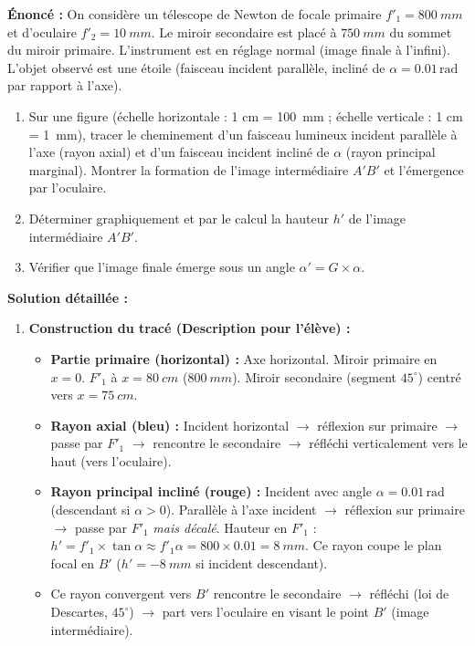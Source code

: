 \documentclass[11pt]{article}
\begin{document}
\begin{exoresolu}
\textbf{Énoncé :} On considère un télescope de Newton de focale primaire $f'_1 = \SI{800}{mm}$ et d'oculaire $f'_2 = \SI{10}{mm}$. Le miroir secondaire est placé à $\SI{750}{mm}$ du sommet du miroir primaire. L'instrument est en réglage normal (image finale à l'infini). L'objet observé est une étoile (faisceau incident parallèle, incliné de $\alpha = \num{0,01}\,\text{rad}$ par rapport à l'axe).
\begin{enumerate}
    \item Sur une figure (échelle horizontale : 1 cm = \SI{100}{mm} ; échelle verticale : 1 cm = \SI{1}{mm}), tracer le cheminement d'un faisceau lumineux incident parallèle à l'axe (rayon axial) et d'un faisceau incident incliné de $\alpha$ (rayon principal marginal). Montrer la formation de l'image intermédiaire $A'B'$ et l'émergence par l'oculaire.
    \item Déterminer graphiquement et par le calcul la hauteur $h'$ de l'image intermédiaire $A'B'$.
    \item Vérifier que l'image finale émerge sous un angle $\alpha' = G \times \alpha$.
\end{enumerate}
\tcblower
\textbf{Solution détaillée :}
\begin{enumerate}
    \item \textbf{Construction du tracé (Description pour l'élève) :}
    \begin{itemize}
        \item \textbf{Partie primaire (horizontal) :} Axe horizontal. Miroir primaire en $x=0$. $F'_1$ à $x=\SI{80}{cm}$ ($\SI{800}{mm}$). Miroir secondaire (segment $45^\circ$) centré vers $x=\SI{75}{cm}$.
        \item \textbf{Rayon axial (bleu) :} Incident horizontal $\rightarrow$ réflexion sur primaire $\rightarrow$ passe par $F'_1$ $\rightarrow$ rencontre le secondaire $\rightarrow$ réfléchi verticalement vers le haut (vers l'oculaire).
        \item \textbf{Rayon principal incliné (rouge) :} Incident avec angle $\alpha = \num{0,01}\,\text{rad}$ (descendant si $\alpha>0$). Parallèle à l'axe incident $\rightarrow$ réflexion sur primaire $\rightarrow$ passe par $F'_1$ \emph{mais décalé}. Hauteur en $F'_1$ : $h' = f'_1 \times \tan\alpha \approx f'_1 \alpha = 800 \times \num{0,01} = \SI{8}{mm}$. Ce rayon coupe le plan focal en $B'$ ($h' = -\SI{8}{mm}$ si incident descendant).
        \item Ce rayon convergent vers $B'$ rencontre le secondaire $\rightarrow$ réfléchi (loi de Descartes, $45^\circ$) $\rightarrow$ part vers l'oculaire en visant le point $B'$ (image intermédiaire).

\end{itemize}
\end{enumerate}
\end{exoresolu}
\end{document}
